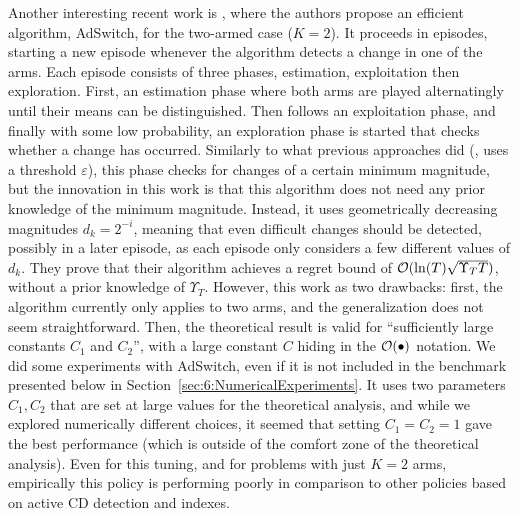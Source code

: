 Another interesting recent work is \cite{AuerGajaneOrtner18}, where the authors propose an efficient algorithm, AdSwitch, for the two-armed case ($K=2$).
It proceeds in episodes, starting a new episode whenever the algorithm detects a change in one of the arms.
Each episode consists of three phases, estimation, exploitation then exploration.
First, an estimation phase where both arms are played alternatingly until their means can be distinguished.
Then follows an exploitation phase, and finally with some low probability, an exploration phase is started that checks whether a change has occurred.
Similarly to what previous approaches did (\eg, \CUSUM{} uses a threshold $\varepsilon$), this phase checks for changes of a certain minimum magnitude, but the innovation in this work is that this algorithm does not need any prior knowledge of the minimum magnitude.
Instead, it uses geometrically decreasing magnitudes $d_k = 2^{-i}$, meaning that even difficult changes should be detected, possibly in a later episode, as each episode only considers a few different values of $d_k$.
They prove that their algorithm achieves a regret bound of $\mathcal{O}(\ln(T) \sqrt{\Upsilon_T T})$, without a prior knowledge of $\Upsilon_T$.
However, this work as two drawbacks:
first, the algorithm currently only applies to two arms, and the generalization does not seem straightforward.
Then, the theoretical result is valid for ``sufficiently large constants $C_1$ and $C_2$'', with a large constant $C$ hiding in the $\mathcal{O}(\bullet)$ notation.
We did some experiments with AdSwitch, even if it is not included in the benchmark presented below in Section~\ref{sec:6:NumericalExperiments}. It uses two parameters $C_1,C_2$ that are set at large values for the theoretical analysis,
and while we explored numerically different choices, it seemed that setting $C_1=C_2=1$ gave the best performance (which is outside of the comfort zone of the theoretical analysis). Even for this tuning, and for problems with just $K=2$ arms, empirically  this policy is performing poorly in comparison to other policies based on active CD detection and \klUCB{} indexes.


